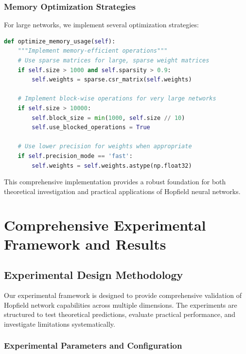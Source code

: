 \documentclass[11pt,a4paper]{article}
\begin{document}
\subsubsection{Memory Optimization Strategies}

For large networks, we implement several optimization strategies:

\begin{lstlisting}[language=Python, caption=Memory Optimization]
def optimize_memory_usage(self):
    """Implement memory-efficient operations"""
    # Use sparse matrices for large, sparse weight matrices
    if self.size > 1000 and self.sparsity > 0.9:
        self.weights = sparse.csr_matrix(self.weights)
    
    # Implement block-wise operations for very large networks
    if self.size > 10000:
        self.block_size = min(1000, self.size // 10)
        self.use_blocked_operations = True
    
    # Use lower precision for weights when appropriate
    if self.precision_mode == 'fast':
        self.weights = self.weights.astype(np.float32)
\end{lstlisting}

This comprehensive implementation provides a robust foundation for both theoretical investigation and practical applications of Hopfield neural networks.

\section{Comprehensive Experimental Framework and Results}

\subsection{Experimental Design Methodology}

Our experimental framework is designed to provide comprehensive validation of Hopfield network capabilities across multiple dimensions. The experiments are structured to test theoretical predictions, evaluate practical performance, and investigate limitations systematically.

\subsubsection{Experimental Parameters and Configuration}
\end{document}
